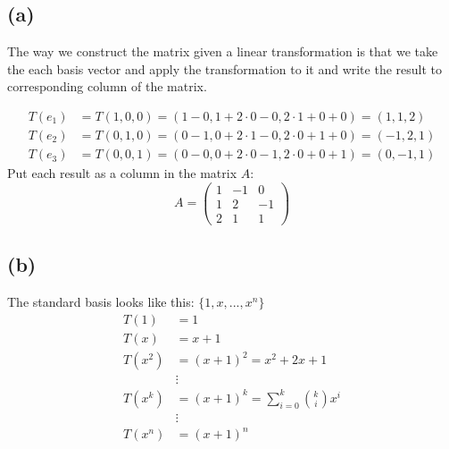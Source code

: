 \documentclass{article}
\begin{document}

\subsection*{(a)}

The way we construct the matrix given a linear transformation is that we take the each basis vector and apply the
transformation to it and write the result to corresponding column of the matrix.

\begin{align*}
   T(e_1) &= T(1, 0, 0) = (1 - 0, 1 + 2 \cdot 0 - 0, 2 \cdot 1 + 0 + 0) = (1, 1, 2) \\
   T(e_2) &= T(0, 1, 0) = (0 - 1, 0 + 2 \cdot 1 - 0, 2 \cdot 0 + 1 + 0) = (-1, 2, 1) \\
   T(e_3) &= T(0, 0, 1) = (0 - 0, 0 + 2 \cdot 0 - 1, 2 \cdot 0 + 0 + 1) = (0, -1, 1)
\end{align*}
Put each result as a column in the matrix \( A \):
\[
   A = \begin{pmatrix}
       1 & -1 & 0 \\
       1 & 2 & -1 \\
       2 & 1 & 1
   \end{pmatrix}
\]

\subsection*{(b)}
The standard basis looks like this: \(\{1, x, ..., x^n\}\)
\begin{align*}
   T(1) &= 1 \\
   T(x) &= x + 1 \\
   T(x^2) &= (x + 1)^2 = x^2 + 2x + 1 \\
   &\vdots \\
   T(x^k) &= (x + 1)^k = \sum_{i=0}^{k} \binom{k}{i}x^i \\
   &\vdots \\
   T(x^n) &= (x + 1)^n
\end{align*}
\end{document}
